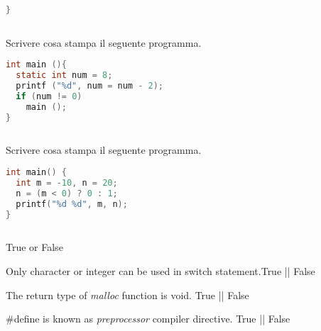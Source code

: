 \documentclass[addpoints,11pt]{exam}
\begin{document}
\begin{questions}
\begin{minipage}[t]{0.4\linewidth}
\begin{lstlisting}[language=C]
}
  
\end{lstlisting}
\end{minipage}
\begin{minipage}[t]{0.6\linewidth}
       \makeemptybox{60pt}
\end{minipage}

\question[4]
Scrivere cosa stampa il seguente programma.

\begin{minipage}[t]{0.4\linewidth}
\begin{lstlisting}[language=C]
int main (){
  static int num = 8;
  printf ("%d", num = num - 2);
  if (num != 0)
    main ();
}
  
\end{lstlisting}
\end{minipage}
\begin{minipage}[t]{0.6\linewidth}
       \makeemptybox{60pt}
\end{minipage}

\question[4]
Scrivere cosa stampa il seguente programma.

\begin{minipage}[t]{0.4\linewidth}
\begin{lstlisting}[language=C]
int main() {
  int m = -10, n = 20;
  n = (m < 0) ? 0 : 1;
  printf("%d %d", m, n);
}
  
\end{lstlisting}
\end{minipage}
\begin{minipage}[t]{0.6\linewidth}
       \makeemptybox{60pt}
\end{minipage}





\begin{center}
\vspace*{\stretch{}}
True or False
\vspace*{\stretch{}}
\end{center}

\question[2]
Only character or integer can be used in switch statement.\space\space\space\space\space\space\space\space True || False 

\question[2]
The return type of \emph{malloc} function is void.  \space\space\space\space\space\space\space\space\space\space\space\space\space\space\space\space\space\space\space\space\space\space\space  True || False 

\question[2]
#define is known as \emph{preprocessor} compiler directive.  \space\space\space\space\space\space\space\space\space\space\space\space\space\space\space\space  True || False 


\end{questions}
\end{document}
